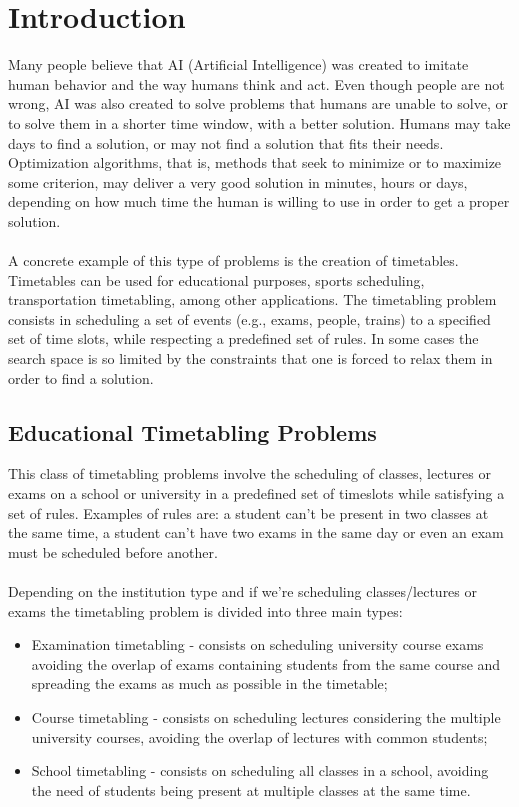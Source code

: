 \setcounter{secnumdepth}{2}
\chapter{Introduction}
\label{introduction}
\thispagestyle{plain}

Many people believe that AI (Artificial Intelligence) was created to imitate human behavior and the way humans think and act. Even though people are not wrong, AI was also created to solve problems that humans are unable to solve, or to solve them in a shorter time window, with a better solution. Humans may take days to find a solution, or may not find a solution that fits their needs. Optimization algorithms, that is, methods that seek to minimize or to maximize some criterion, may deliver a very good solution in minutes, hours or days, depending on how much time the human is willing to use in order to get a proper solution.\\
\\
A concrete example of this type of problems is the creation of timetables. Timetables can be used for educational purposes, sports scheduling, transportation timetabling, among other applications. The timetabling problem consists in scheduling a set of events (e.g., exams, people, trains) to a specified set of time slots, while respecting a predefined set of rules. In some cases the search space is so limited by the constraints that one is forced to relax them in order to find a solution. 


\section{Educational Timetabling Problems}

This class of timetabling problems involve the scheduling of classes, lectures or exams on a school or university in a predefined set of timeslots while satisfying a set of rules. Examples of rules are: a student can't be present in two classes at the same time, a student can't have two exams in the same day or even an exam must be scheduled before another.\\
\\
Depending on the institution type and if we're scheduling classes/lectures or exams the timetabling problem is divided into three main types:

\begin{itemize}
	\item Examination timetabling - consists on scheduling university course exams avoiding the overlap of exams containing students from the same course and spreading the exams as much as possible in the timetable;
	\item Course timetabling - consists on scheduling lectures considering the multiple university courses, avoiding the overlap of lectures with common students;
	\item School timetabling - consists on scheduling all classes in a school, avoiding the need of students being present at multiple classes at the same time.
\end{itemize}

